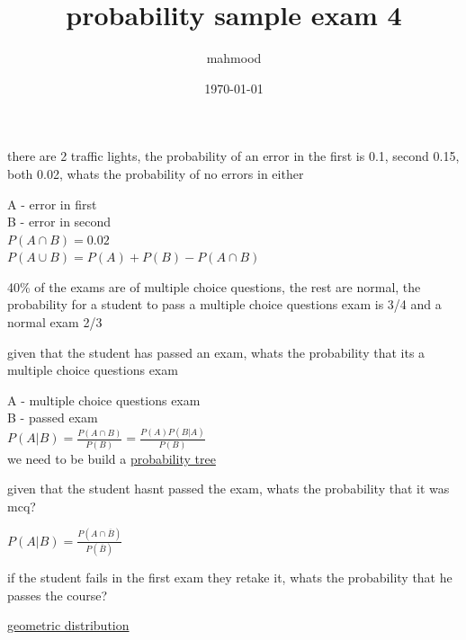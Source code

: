 \documentclass[a4paper,12pt]{article}
\author{mahmood}
\date{\today}
\title{probability sample exam 4}
\begin{document}
\maketitle
\begin{question}
there are 2 traffic lights, the probability of an error in the first is 0.1, second 0.15, both 0.02, whats the probability of no errors in either\\
\begin{answer}
A - error in first\\
B - error in second\\
\(P(A \cap B)=0.02\)\\
\(P(A \cup B)=P(A)+P(B)-P(A \cap B)\)\\
\end{answer}
\end{question}
\begin{question}
40\% of the exams are of multiple choice questions, the rest are normal, the probability for a student to pass a multiple choice questions exam is 3/4 and a normal exam 2/3\\
\begin{subquestion}
given that the student has passed an exam, whats the probability that its a multiple choice questions exam\\
\begin{answer}
A - multiple choice questions exam\\
B - passed exam\\
\(P(A|B)=\frac{P(A \cap B)}{P(B)}=\frac{P(A)P(B|A)}{P(B)}\)\\
we need to be build a \href{20230126225225-probability_tree.org}{probability tree}\\
\end{answer}
\end{subquestion}
\begin{subquestion}
given that the student hasnt passed the exam, whats the probability that it was mcq?\\
\begin{answer}
\(P(A|B)=\frac{P(A \cap \overline{B})}{P(\overline{B})}\)\\
\end{answer}
\end{subquestion}
\begin{subquestion}
if the student fails in the first exam they retake it, whats the probability that he passes the course?\\
\begin{answer}
\href{20230113173836-geometric_distribution.org}{geometric distribution}\\
\end{answer}
\end{subquestion}
\end{question}
\end{document}
